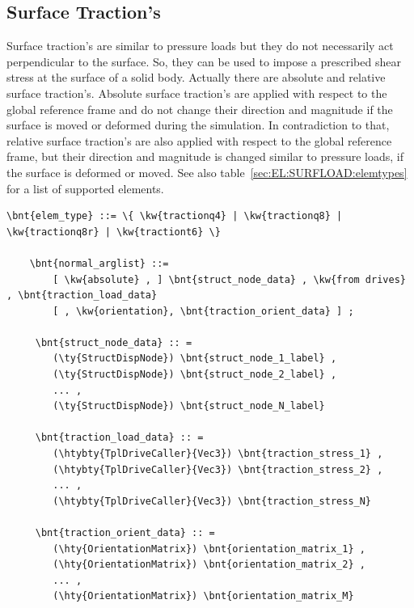 \subsection{Surface Traction's}
Surface traction's are similar to pressure loads but they do not necessarily act perpendicular to the surface.
So, they can be used to impose a prescribed shear stress at the surface of a solid body.
Actually there are absolute and relative surface traction's. Absolute surface traction's are applied with respect
to the global reference frame and do not change their direction and magnitude if the surface is moved
or deformed during the simulation. In contradiction to that, relative surface traction's are also applied with respect
to the global reference frame, but their direction and magnitude is changed similar to pressure loads, if the surface is deformed or moved.
See also table~\ref{sec:EL:SURFLOAD:elemtypes} for a list of supported elements.
\begin{Verbatim}[commandchars=\\\{\}]
  \bnt{elem_type} ::= \{ \kw{tractionq4} | \kw{tractionq8} | \kw{tractionq8r} | \kw{tractiont6} \}

    \bnt{normal_arglist} ::=
        [ \kw{absolute} , ] \bnt{struct_node_data} , \kw{from drives} , \bnt{traction_load_data}
        [ , \kw{orientation}, \bnt{traction_orient_data} ] ;

     \bnt{struct_node_data} :: =
        (\ty{StructDispNode}) \bnt{struct_node_1_label} ,
        (\ty{StructDispNode}) \bnt{struct_node_2_label} ,
        ... ,
        (\ty{StructDispNode}) \bnt{struct_node_N_label}

     \bnt{traction_load_data} :: =
        (\htybty{TplDriveCaller}{Vec3}) \bnt{traction_stress_1} ,
        (\htybty{TplDriveCaller}{Vec3}) \bnt{traction_stress_2} ,
        ... ,
        (\htybty{TplDriveCaller}{Vec3}) \bnt{traction_stress_N}

     \bnt{traction_orient_data} :: =
        (\hty{OrientationMatrix}) \bnt{orientation_matrix_1} ,
        (\hty{OrientationMatrix}) \bnt{orientation_matrix_2} ,
        ... ,
        (\hty{OrientationMatrix}) \bnt{orientation_matrix_M}
\end{Verbatim}

